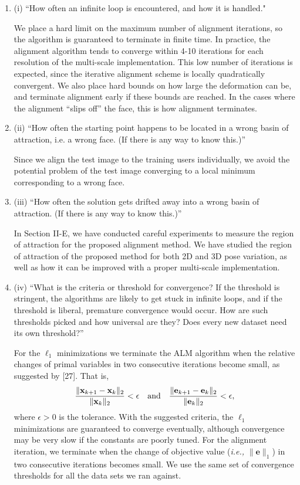 \documentclass[11pt]{article}
\newcommand{\ie}{{\it i.e., }}
\newcommand{\e}{\mathbf{e}}
\newcommand{\x}{\mathbf{x}}
\begin{document}
\begin{enumerate}
\item (i) ``How often an infinite loop is encountered, and how it is handled."

We place a hard limit on the maximum number of alignment iterations, so the
algorithm is guaranteed to terminate in finite time.  In practice, the
alignment algorithm tends to converge within 4-10 iterations for each
resolution of the multi-scale implementation. This low number of iterations is expected, since the iterative alignment scheme is locally quadratically convergent. We also place hard bounds on how
large the deformation can be, and terminate alignment early if these bounds are
reached.  In the cases where the alignment ``slips off'' the face, this is how
alignment terminates.

\item (ii) ``How often the starting point happens to be located in a wrong basin of
attraction, i.e. a wrong face. (If there is any way to know this.)''

Since we align the test image to the training users individually, we avoid the
potential problem of the test image converging to a local minimum corresponding
to a wrong face.

\item (iii) ``How often the solution gets drifted away into a wrong basin of
attraction. (If there is any way to know this.)''

In Section II-E, we have conducted careful experiments to measure the region of attraction
for the proposed alignment method. We have studied the region of attraction of the proposed
method for both 2D and 3D pose variation, as well as how it can be improved with a proper
multi-scale implementation.

\item (iv) ``What is the criteria or threshold for convergence? If the threshold is
stringent, the algorithms are likely to get stuck in infinite loops, and if the
threshold is liberal, premature convergence would occur. How are such
thresholds picked and how universal are they? Does every new dataset need its
own threshold?''

For the $\ell_1$ minimizations we terminate the ALM
algorithm when the relative changes of primal variables in
two consecutive iterations become small, as suggested by
[27]. That is,
\begin{displaymath}
\frac{\|\x_{k+1}-\x_k\|_2}{\|\x_k\|_2} < \epsilon \quad
\textup{and} \quad \frac{\|\e_{k+1}-\e_k\|_2}{\|\e_k\|_2} <
\epsilon,
\end{displaymath}
where $\epsilon>0$ is the tolerance. With the suggested
criteria, the $\ell_1$ minimizations are guaranteed to converge
eventually, although convergence may be very slow if the constants
are poorly tuned. For the alignment
iteration, we terminate when the change of objective value
(\ie $\|\e\|_1$) in two consecutive iterations becomes
small. We use the same set of convergence thresholds for
all the data sets we ran against. 


\end{enumerate}
\end{document}
